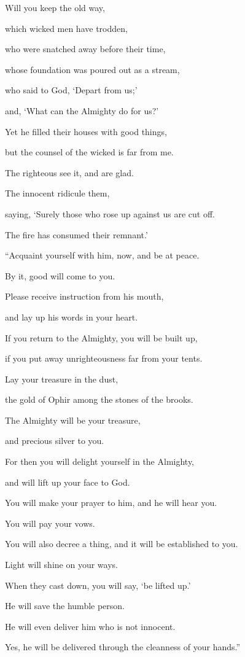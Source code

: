 {\par }{\Q {}Will you keep the old way,
\par }{\QB which wicked men have trodden,
\par }{\Q {}who were snatched away before their time,
\par }{\QB whose foundation was poured out as a stream,
\par }{\Q {}who said to God, ‘Depart from us;’
\par }{\QB and, ‘What can the Almighty do for us?’
\par }{\Q {}Yet he filled their houses with good things,
\par }{\QB but the counsel of the wicked is far from me.
\par }{\Q {}The righteous see it, and are glad.
\par }{\QB The innocent ridicule them,
\par }{\Q {}saying, ‘Surely those who rose up against us are cut off.
\par }{\QB The fire has consumed their remnant.’
\par }{\BB \par }{\Q {}“Acquaint yourself with him, now, and be at peace.
\par }{\QB By it, good will come to you.
\par }{\Q {}Please receive instruction from his mouth,
\par }{\QB and lay up his words in your heart.
\par }{\Q {}If you return to the Almighty, you will be built up,
\par }{\QB if you put away unrighteousness far from your tents.
\par }{\Q {}Lay your treasure in the dust,
\par }{\QB the gold of Ophir among the stones of the brooks.
\par }{\Q {}The Almighty will be your treasure,
\par }{\QB and precious silver to you.
\par }{\Q {}For then you will delight yourself in the Almighty,
\par }{\QB and will lift up your face to God.
\par }{\Q {}You will make your prayer to him, and he will hear you.
\par }{\QB You will pay your vows.
\par }{\Q {}You will also decree a thing, and it will be established to you.
\par }{\QB Light will shine on your ways.
\par }{\Q {}When they cast down, you will say, ‘be lifted up.’
\par }{\QB He will save the humble person.
\par }{\Q {}He will even deliver him who is not innocent.
\par }{\QB Yes, he will be delivered through the cleanness of your hands.”

}
